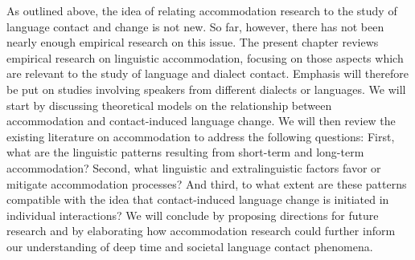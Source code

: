 \documentclass[output=paper,
modfonts
]{langscibook}
\begin{document}
As outlined above, the idea of relating accommodation research to the study of language contact and change is not new. So far, however, there has not been nearly enough empirical research on this issue. The present chapter reviews empirical research on linguistic accommodation, focusing on those aspects which are relevant to the study of language and dialect contact. Emphasis will therefore be put on studies involving speakers from different dialects or languages. We will start by discussing theoretical models on the relationship between accommodation and contact-induced language change. We will then review the existing literature on accommodation to address the following questions: First, what are the linguistic patterns resulting from short-term and long-term accommodation? Second, what linguistic and extralinguistic factors favor or mitigate accommodation processes? And third, to what extent are these patterns compatible with the idea that contact-induced language change is initiated in individual interactions? We will conclude by proposing directions for future research and by elaborating how accommodation research could further inform our understanding of deep time and societal language contact phenomena.
% 
% 
% 
% 
% 
% 
% 
%
\end{document}
